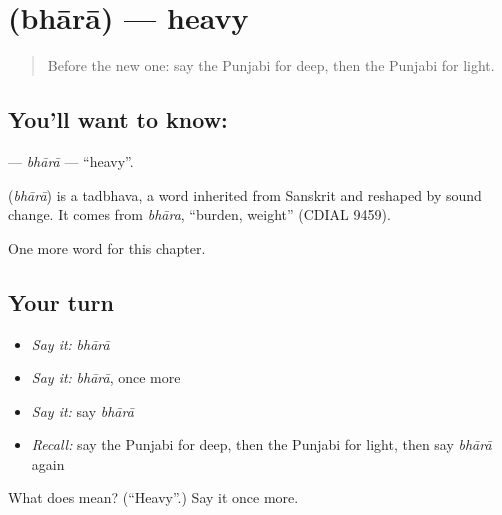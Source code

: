 \section[\texorpdfstring{\pa{ਭਾਰਾ} (bhārā)}{ਭਾਰਾ (bhārā)}]{ (bhārā) — heavy}

\label{lesson:PA-C140-bhara}



\begin{quote}
Before the new one: say the Punjabi for deep, then the Punjabi for light.
\end{quote}

\subsection*{You'll want to know: }
\textbf{} — \emph{bhārā} — \textquotedblleft{}heavy\textquotedblright{}.

\begin{cousinweb}
\textbf{} (\emph{bhārā}) is a tadbhava, a word inherited from Sanskrit and reshaped by sound change. It comes from \emph{bhāra}, \textquotedblleft{}burden, weight\textquotedblright{} (CDIAL 9459).
\end{cousinweb}

\begin{grammarlens}[title={What you've built}]
One more word for this chapter.
\end{grammarlens}

\subsection*{Your turn}
\begin{itemize}
\raggedright
  \item \emph{Say it:} \emph{bhārā}
  \item \emph{Say it:} \emph{bhārā}, once more
  \item \emph{Say it:} say \emph{bhārā}
  \item \emph{Recall:} say the Punjabi for deep, then the Punjabi for light, then say \emph{bhārā} again
\end{itemize}

\begin{tcolorbox}[breakable,colback=teal!4,colframe=teal!35!black,title={Before you move on}]
What does  mean? (\textquotedblleft{}Heavy\textquotedblright{}.) Say it once more.
\end{tcolorbox}
